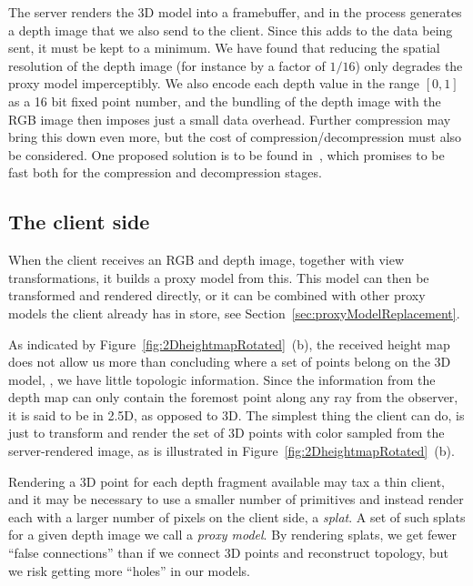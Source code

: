 The server renders the 3D model into a framebuffer, and in the process generates
a depth image that we also send to the client.
Since this adds to the data being sent, it must be kept to a minimum. We have
found that reducing the spatial resolution of the depth image (for instance by a
factor of $1/16$) only degrades the proxy model imperceptibly.  We also encode
each depth value in the range $[0, 1]$ as a 16 bit fixed point number, and the
bundling of the depth image with the RGB image then imposes just a small data
overhead.
Further compression may bring this down even more, but the cost of
compression/decompression must also be
considered.
One proposed solution is to be found in~\cite{DBLP:journals/tvcg/Lindstrom14},
which promises to be fast both for the compression and decompression stages.


\subsection{The client side}
\label{sec:client}

When the client receives an RGB and depth image, together with view
transformations, it builds a proxy model from this. This model can then be
transformed and rendered directly, or it can be combined with other proxy models
the client already has in store, see Section~\ref{sec:proxyModelReplacement}.

As indicated by Figure~\ref{fig:2DheightmapRotated}~(b), the received height map
does not allow us more than concluding where a set of points belong on the 3D
model, \ie, we have little topologic information. Since the information from the
depth map can only contain the foremost point along any ray from the observer,
it is said to be in 2.5D, as opposed to 3D.  The simplest thing the client can
do, is just to transform and render the set of 3D points with color sampled from
the server-rendered image, as is illustrated in
Figure~\ref{fig:2DheightmapRotated}~(b).

Rendering a 3D point for each depth fragment available may tax a thin client,
and it may be necessary to use a smaller number of primitives and instead render
each with a larger number of pixels on the client side, a {\em splat}.  A set of
such splats for a given depth image we call a {\em proxy model}. By rendering
splats, we get fewer ``false connections'' than if we connect 3D points and
reconstruct topology, but we risk getting more ``holes'' in our models.

